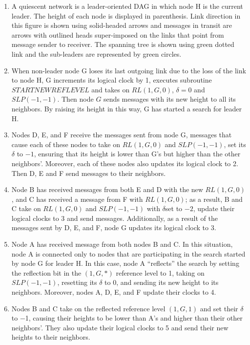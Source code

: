 \documentclass{article}
\begin{document}
\begin{enumerate}[label=\alph *)]

\item A quiescent network is a leader-oriented DAG in which node H is the current leader. The height of each node is displayed in parenthesis. Link direction in this figure is shown using solid-headed arrows and messages in transit are arrows with outlined heads super-imposed on the links that point from message sender to receiver. The spanning tree is shown using green dotted link and the sub-leaders are represented by green circles.

\item When non-leader node G loses its last outgoing link due to the loss of the link to node H, G increments
its logical clock by 1, executes subroutine $STARTNEWREFLEVEL$ and takes on $RL(1,G,0)$, $\delta = 0$ and $SLP(-1,-1)$.
Then node $G$ sends messages with its new height to all its neighbors. By raising its height in this way, G has started a search for leader H.

\item Nodes D, E, and F receive the messages sent from node G, messages that cause each of these nodes to take on
$RL(1,G,0)$ and $SLP(-1,-1)$, set its $\delta $ to $−1$, ensuring that its height is lower than G’s but higher than the other neighbors’. Moreover, each of these nodes also updates its logical clock to 2. Then D, E and F send messages to their neighbors.

\item Node B has received messages from both E and D with the new $RL(1,G,0)$, and C has received a message
from F with $RL(1,G,0)$; as a result, B and C take on $RL(1,G,0)$ and $SLP(-1,-1)$ with $\delta $set to $−2$, update their logical clocks to 3 and send messages. Additionally, as a result of the messages sent by D, E, and F, node G updates its logical clock to 3.

\item Node A has received message from both nodes B and C. In this situation, node A is connected only to nodes that are participating in the search started by node G for leader H. In this case, node A “reflects” the search by setting the reflection bit in the $(1,G,*)$ reference level to 1, taking on $SLP(-1,-1)$, resetting its $\delta $ to 0, and sending its new height to its neighbors. Moreover, nodes A, D, E, and F update their clocks to 4.

\item Nodes B and C take on the reflected reference level $(1,G,1)$ and set their $\delta $ to −1, causing their heights to be lower than A’s and higher than their other neighbors’. They also update their logical clocks to 5 and send their new heights to their neighbors.


\end{enumerate}
\end{document}
